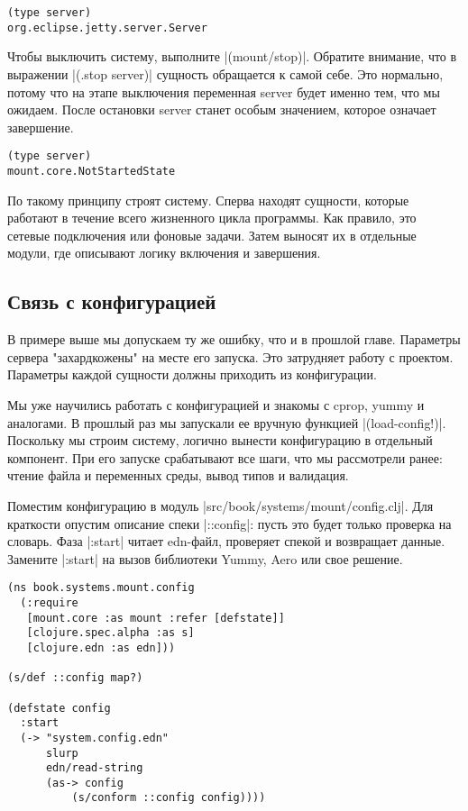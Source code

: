 \begin{verbatim}
(type server)
org.eclipse.jetty.server.Server
\end{verbatim}

Чтобы выключить систему, выполните \spverb|(mount/stop)|. Обратите внимание, что в
выражении \spverb|(.stop server)| сущность обращается к самой себе. Это нормально,
потому что на этапе выключения переменная server будет именно тем, что мы
ожидаем. После остановки server станет особым значением, которое означает
завершение.

\begin{verbatim}
(type server)
mount.core.NotStartedState
\end{verbatim}

По такому принципу строят систему. Сперва находят сущности, которые работают в
течение всего жизненного цикла программы. Как правило, это сетевые подключения
или фоновые задачи. Затем выносят их в отдельные модули, где описывают логику
включения и завершения.

\subsection{Связь с конфигурацией}

В примере выше мы допускаем ту же ошибку, что и в прошлой главе. Параметры
сервера "захардкожены" на месте его запуска. Это затрудняет работу с
проектом. Параметры каждой сущности должны приходить из конфигурации.

Мы уже научились работать с конфигурацией и знакомы с cprop, yummy и
аналогами. В прошлый раз мы запускали ее вручную функцией
\spverb|(load-config!)|. Поскольку мы строим систему, логично вынести конфигурацию в
отдельный компонент. При его запуске срабатывают все шаги, что мы рассмотрели
ранее: чтение файла и переменных среды, вывод типов и валидация.

Поместим конфигурацию в модуль \spverb|src/book/systems/mount/config.clj|. Для
краткости опустим описание спеки \spverb|::config|: пусть это будет только проверка на
словарь. Фаза \spverb|:start| читает edn-файл, проверяет спекой и возвращает
данные. Замените \spverb|:start| на вызов библиотеки Yummy, Aero или свое решение.

\begin{verbatim}
(ns book.systems.mount.config
  (:require
   [mount.core :as mount :refer [defstate]]
   [clojure.spec.alpha :as s]
   [clojure.edn :as edn]))

(s/def ::config map?)

(defstate config
  :start
  (-> "system.config.edn"
      slurp
      edn/read-string
      (as-> config
          (s/conform ::config config))))
\end{verbatim}

